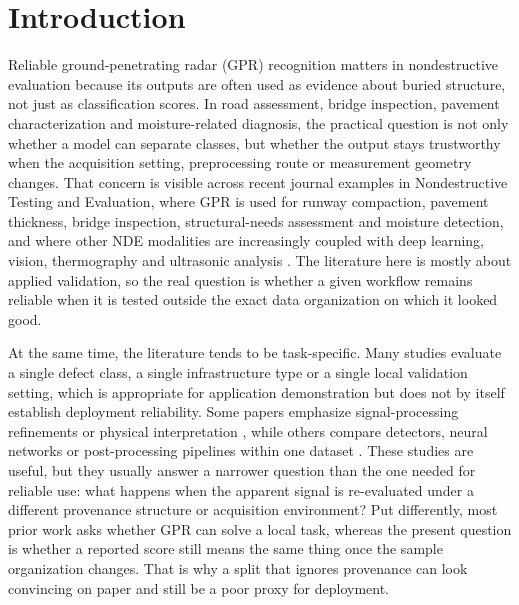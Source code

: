 \documentclass[]{interact}
\begin{document}
\section{Introduction}

Reliable ground-penetrating radar (GPR) recognition matters in nondestructive evaluation because its outputs are often used as evidence about buried structure, not just as classification scores. In road assessment, bridge inspection, pavement characterization and moisture-related diagnosis, the practical question is not only whether a model can separate classes, but whether the output stays trustworthy when the acquisition setting, preprocessing route or measurement geometry changes. That concern is visible across recent journal examples in Nondestructive Testing and Evaluation, where GPR is used for runway compaction, pavement thickness, bridge inspection, structural-needs assessment and moisture detection, and where other NDE modalities are increasingly coupled with deep learning, vision, thermography and ultrasonic analysis \cite{cheng2023runway,hu2016pavement,benedetto2012bridges,plati2012structural,kilic2014moisture,rathod2024uav,ibrahim2024thermography,qu2024impactecho}. The literature here is mostly about applied validation, so the real question is whether a given workflow remains reliable when it is tested outside the exact data organization on which it looked good.

At the same time, the literature tends to be task-specific. Many studies evaluate a single defect class, a single infrastructure type or a single local validation setting, which is appropriate for application demonstration but does not by itself establish deployment reliability. Some papers emphasize signal-processing refinements or physical interpretation \cite{economou2012deconvolution,lualdi2014polarisation,artagan2022thermal,wang2024tracer,dong2024vibrometry}, while others compare detectors, neural networks or post-processing pipelines within one dataset \cite{cheng2023runway,wang2024crack,kilic2014moisture,rathod2024uav,nategh2024kmeans,li2024pinn}. These studies are useful, but they usually answer a narrower question than the one needed for reliable use: what happens when the apparent signal is re-evaluated under a different provenance structure or acquisition environment? Put differently, most prior work asks whether GPR can solve a local task, whereas the present question is whether a reported score still means the same thing once the sample organization changes. That is why a split that ignores provenance can look convincing on paper and still be a poor proxy for deployment.
\end{document}
